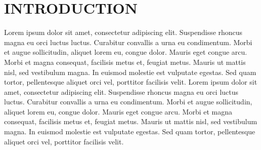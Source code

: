 \section{\uppercase{Introduction}}
Lorem ipsum dolor sit amet, consectetur adipiscing elit. Suspendisse rhoncus magna eu orci luctus luctus. Curabitur convallis a urna eu condimentum. Morbi et augue sollicitudin, aliquet lorem eu, congue dolor. Mauris eget congue arcu. Morbi et magna consequat, facilisis metus et, feugiat metus. Mauris ut mattis nisl, sed vestibulum magna. In euismod molestie est vulputate egestas. Sed quam tortor, pellentesque aliquet orci vel, porttitor facilisis velit. Lorem ipsum dolor sit amet, consectetur adipiscing elit. Suspendisse rhoncus magna eu orci luctus luctus. Curabitur convallis a urna eu condimentum. Morbi et augue sollicitudin, aliquet lorem eu, congue dolor. Mauris eget congue arcu. Morbi et magna consequat, facilisis metus et, feugiat metus. Mauris ut mattis nisl, sed vestibulum magna. In euismod molestie est vulputate egestas. Sed quam tortor, pellentesque aliquet orci vel, porttitor facilisis velit. \cite{Dummy:2011}
